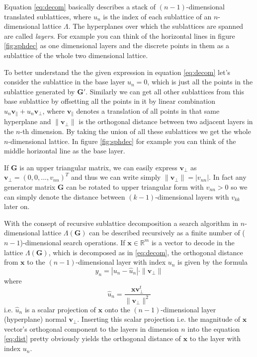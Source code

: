 \documentclass[english,12pt,a4paper,pdftex,sci,utf8]{aaltothesis}
\begin{document}
\noindent Equation \eqref{eq:decom} basically describes a stack of $(n-1)$-dimensional translated sublattices, where $u_n$ is the index of each sublattice of an $n$-dimensional lattice $\Lambda$. The hyperplanes over which the sublattices are spanned are called \textit{layers}. For example you can think of the horizontal lines in figure \ref{fig:sphdec} as one dimensional layers and the discrete points in them as a sublattice of the whole two dimensional lattice. 
\par To better understand the the given expression in equation \eqref{eq:decom} let's consider the sublattice in the base layer $u_n = 0$, which is just all the points in the sublattice generated by $\mathbf{G}'$. Similarly we can get all other sublattices from this base sublattice by offsetting all the points in it by linear combination $u_n\mathbf{v}_{\parallel}+u_n\mathbf{v}_{\bot}$, where $\mathbf{v}_{\parallel}$ denotes a translation of all points in that same hyperplane and $\|\mathbf{v}_{\bot}\|$ is the orthogonal distance between two adjacent layers in the $n$-th dimension. By taking the union of all these sublattices we get the whole $n$-dimensional lattice. In figure \ref{fig:sphdec} for example you can think of the middle horizontal line as the base layer.
\par If $\mathbf{G}$ is an upper triangular matrix, we can easily express $\mathbf{v}_{\bot}$ as $\mathbf{v}_{\bot} = (0, 0, ..., v_{nn})^T$ and thus we can write simply $\|\mathbf{v}_{\bot}\| = |v_{nn}|$. In fact any generator matrix $\mathbf{G}$ can be rotated to upper triangular form \cite{agrell} with $v_{nn} > 0$ so we can simply denote the distance between $(k-1)$-dimensional layers with $v_{kk}$ later on.
\par With the consept of recursive sublattice decomposition a search algorithm in $n$-dimensional lattice $\Lambda(\mathbf{G})$ can be described recursively as a finite number of ($n-1$)-dimensional search operations. If $\mathbf{x} \in \mathbb{R}^m$ is a vector to decode in the lattice $\Lambda(\mathbf{G})$, which is decomposed as in \eqref{eq:decom}, the orthogonal distance from $\mathbf{x}$ to the $(n-1)$-dimensional layer with index $u_n$ is given by the formula
\begin{equation}
y_n = |u_n-\hat{u}_n| \cdot \|\mathbf{v}_{\bot}\|
\label{eq:dist}
\end{equation}
where
\begin{equation}
\hat{u}_n = \frac{\mathbf{xv}_{\bot}^t}{\|\mathbf{v}_{\bot}\|^2}
\label{eq:uhat}
\end{equation}
i.e. $\hat{u}_n$ is a scalar projection of $\mathbf{x}$ onto the $(n-1)$-dimensional layer (hyperplane) normal $\mathbf{v}_{\bot}$. Inserting this scalar projection i.e. the magnitude of $\mathbf{x}$ vector's orthogonal component to the layers in dimension $n$ into the equation \eqref{eq:dist} pretty obviously yields the orthogonal distance of $\mathbf{x}$ to the layer with index $u_n$. 
\end{document}
